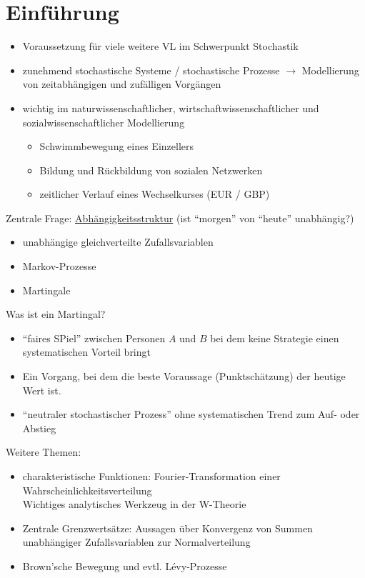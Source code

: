\setcounter{chapter}{-1}
\chapter{Einführung}
\begin{itemize}
\item Voraussetzung für viele weitere VL im Schwerpunkt Stochastik
\item zunehmend stochastische Systeme / stochastische Prozesse $\to$ Modellierung von zeitabhängigen und zufälligen Vorgängen
\item wichtig im naturwissenschaftlicher, wirtschaftwissenschaftlicher und sozialwissenschaftlicher Modellierung
\begin{itemize}
\item Schwimmbewegung eines Einzellers
\item Bildung und Rückbildung von sozialen Netzwerken
\item zeitlicher Verlauf eines Wechselkurses (EUR / GBP)
\end{itemize}
\end{itemize}

Zentrale Frage: \underline{Abhängigkeitsstruktur} (ist ``morgen'' von ``heute'' unabhängig?)
\begin{itemize}
\item unabhängige gleichverteilte Zufallsvariablen
\item Markov-Prozesse
\item Martingale
\end{itemize}

Was ist ein Martingal?
\begin{itemize}
\item ``faires SPiel'' zwischen Personen $A$ und $B$ bei dem keine Strategie einen systematischen Vorteil bringt
\item Ein Vorgang, bei dem die beste Voraussage (Punktschätzung) der heutige Wert ist.
\item ``neutraler stochastischer Prozess'' ohne systematischen Trend zum Auf- oder Abstieg
\end{itemize}

Weitere Themen:
\begin{itemize}
\item charakteristische Funktionen: Fourier-Transformation einer Wahrscheinlichkeitsverteilung\\
Wichtiges analytisches Werkzeug in der W-Theorie
\item Zentrale Grenzwertsätze: Aussagen über Konvergenz von Summen unabhängiger Zufallsvariablen zur Normalverteilung
\item Brown'sche Bewegung und evtl. Lévy-Prozesse
\end{itemize}